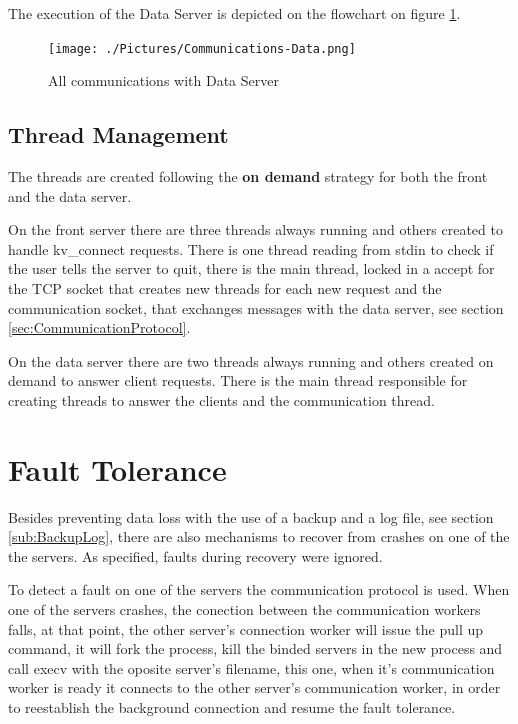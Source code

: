 \documentclass[12pt]{article} %
\begin{document}
The execution of the Data Server is depicted on the flowchart on figure \ref{fig:CommunicationsData}.

\begin{figure}[ht]
\centering
\texttt{[image: ./Pictures/Communications-Data.png]}
\caption{All communications with Data Server}\label{fig:CommunicationsData}
\end{figure}

\subsection{Thread Management}
\label{sub:ThreadManagement}

The threads are created following the \textbf{on demand} strategy for both the front and 
the data server.

On the front server there are three threads always running and others created 
to handle kv\_connect requests. There is one thread reading from stdin to check if 
the user tells the server to quit, there is the main thread, locked in a accept for the 
TCP socket that creates new threads for each new request and the communication 
socket, that exchanges messages with the data server, see section \ref{sec:CommunicationProtocol}.

On the data server there are two threads always running and others created 
on demand to answer client requests. There is the main thread responsible for 
creating threads to answer the clients and the communication thread.

\section{Fault Tolerance}
\label{sec:FaultTolerance}

Besides preventing data loss with the use of a backup and a log file, see section \ref{sub:BackupLog}, 
there are also mechanisms to recover from crashes on one of the the servers. 
As specified, faults during recovery were ignored.

To detect a fault on one of the servers the communication protocol is used. 
When one of the servers crashes, the conection between the communication 
workers falls, at that point, the other server's connection worker will issue the pull 
up command, it will fork the process, kill the binded servers in the new process and 
call execv with the oposite server's filename, this one, when it's communication 
worker is ready it connects to the other server's communication worker, in order 
to reestablish the background connection and resume the fault tolerance.

\end{document}
